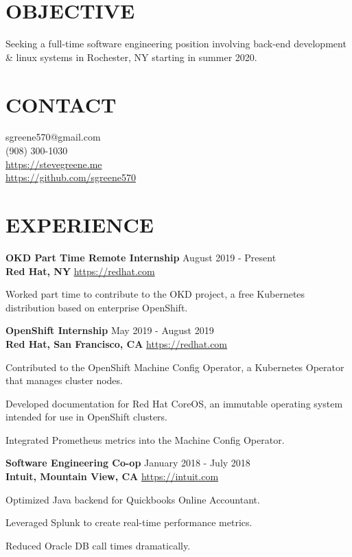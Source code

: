 \documentclass[line, margin, 11pt]{res}
\begin{document}

\begin{resume}

\section{\small OBJECTIVE}
Seeking a full-time software engineering position involving back-end development
    \& linux systems in Rochester, NY starting in summer 2020.

\section{\small CONTACT}
sgreene570@gmail.com \\
(908) 300-1030 \\
\url{https://stevegreene.me} \\
\url{https://github.com/sgreene570}

\section{\small EXPERIENCE}
{\bf \large{OKD Part Time Remote Internship}} \hfill August 2019 - Present \\
{\bf Red Hat, NY} \hfill \url{https://redhat.com}
\begin{compactitem}
    \item Worked part time to contribute to the OKD project, a free Kubernetes distribution based on enterprise OpenShift.
\end{compactitem}


{\bf \large{OpenShift Internship}} \hfill May 2019 - August 2019 \\
{\bf Red Hat, San Francisco, CA} \hfill \url{https://redhat.com}
\begin{compactitem}
    \item Contributed to the OpenShift Machine Config Operator, a Kubernetes Operator that manages cluster nodes.
    \item Developed documentation for Red Hat CoreOS, an immutable operating system intended for use in OpenShift clusters.
    \item Integrated Prometheus metrics into the Machine Config Operator.
\end{compactitem}


{\bf \large{Software Engineering Co-op}} \hfill January 2018 - July 2018 \\
{\bf Intuit, Mountain View, CA} \hfill \url{https://intuit.com}
\begin{compactitem}
    \item Optimized Java backend for Quickbooks Online Accountant.
    \item Leveraged Splunk to create real-time performance metrics.
    \item Reduced Oracle DB call times dramatically.
\end{compactitem}


\end{resume}
\end{document}
